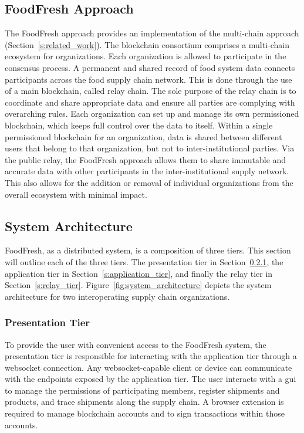 \documentclass[conference,a4paper,flushend]{neutr}
\begin{document}
\subsection{FoodFresh Approach} \label{s:chainfresh_approach}
The FoodFresh approach provides an implementation of the multi-chain approach (Section~\ref{s:related_work}). The blockchain consortium comprises a multi-chain ecosystem for organizations. Each organization is allowed to participate in the consensus process. 
A permanent and shared record of food system data connects participants across the food supply chain network. This is done through the use of a main blockchain, called relay chain. The sole purpose of the relay chain is to coordinate and share appropriate data and ensure all parties are complying with overarching rules.
%
Each organization can set up and manage its own permissioned blockchain, which keeps full control over the data to itself.
%
Within a single permissioned blockchain for an organization, data is shared between different users that belong to that organization, but not to inter-institutional parties.
%
Via the public relay, the FoodFresh approach allows them to share immutable and accurate data with other participants in the inter-institutional supply network.
%
This also allows for the addition or removal of individual organizations from the overall ecosystem with minimal impact.


\subsection{System Architecture} \label{s:system_architecture}
FoodFresh, as a distributed system, is a composition of three tiers. 
This section will outline each of the three tiers. The presentation tier in Section~\ref{s:presentation_tier}, the application tier in Section~\ref{s:application_tier}, and finally the relay tier in Section~\ref{s:relay_tier}. Figure~\ref{fig:system_architecture} depicts the system architecture for two interoperating supply chain organizations. 


\subsubsection{Presentation Tier} \label{s:presentation_tier}
To provide the user with convenient access to the FoodFresh system, the presentation tier is responsible for interacting with the application tier through a websocket connection. 
Any websocket-capable client or device can communicate with the endpoints exposed by the application tier. The user interacts with a \ac{gui} to manage the permissions of participating members, register shipments and products, and trace shipments along the supply chain. A browser extension is required to manage blockchain accounts and to sign transactions within those accounts.
\end{document}
